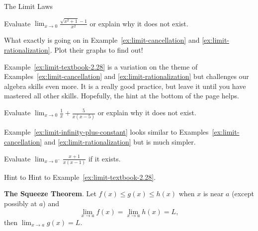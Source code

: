 \documentclass[../main.tex]{subfiles}
\begin{document}
\begin{lesson}{The Limit Laws}
  \begin{example} \label{ex:limit-rationalization}
    Evaluate \(\lim_{x \to 0} \frac{\sqrt{x^{2}+1}-1}{x^{2}}\) or explain why it does not exist.
  \end{example}

  \faComment{} What exactly is going on in Example~\ref{ex:limit-cancellation} and \ref{ex:limit-rationalization}. Plot their graphs to find out!
  \clearpage

  Example~\ref{ex:limit-textbook-2.28} is a variation on the theme of Examples~\ref{ex:limit-cancellation} and \ref{ex:limit-rationalization} but challenges our algebra skills even more. It is a really good practice, but leave it until you have mastered all other skills. Hopefully, the hint at the bottom of the page helps.
  \begin{example} \label{ex:limit-textbook-2.28}
    Evaluate \(\lim_{x \to 0} \frac{1}{x} + \frac{5}{x(x-5)}\) or explain why it does not exist.
  \end{example}

  Example~\ref{ex:limit-infinity-plus-constant} looks similar to Examples~\ref{ex:limit-cancellation} and \ref{ex:limit-rationalization} but is much simpler.
  \begin{example} \label{ex:limit-infinity-plus-constant}
    Evaluate \(\lim_{x \to 0^{-}} \frac{x+1}{x(x-1)}\) if it exists.
  \end{example}

  \vfill{}
  {\scriptsize Hint to Hint to Example~\ref{ex:limit-textbook-2.28}}. \newline
  \clearpage

  \begin{mdframed}[style=withref]
    \textbf{The Squeeze Theorem}. Let {\(f(x) \le g(x) \le h(x)\)} when \(x\) is near \(a\) (except possibly at \(a\)) and
    \[ { \lim_{x \to a} f(x) = \lim_{x \to a} h(x) = L,} \]
    then
    {\(\lim_{x \to a} g(x) = L\).}


\end{mdframed}
\end{lesson}
\end{document}
